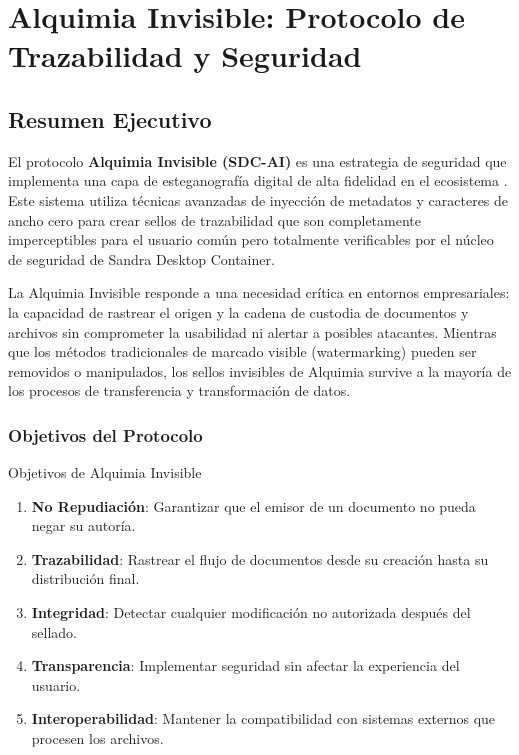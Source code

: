 
\chapter{Alquimia Invisible: Protocolo de Trazabilidad y Seguridad}
\label{ch:alquimia}


\section{Resumen Ejecutivo}
\label{sec:ai-resumen}

El protocolo \textbf{Alquimia Invisible (SDC-AI)} es una estrategia de seguridad que implementa una capa de esteganografía digital de alta fidelidad en el ecosistema \sdc{}. Este sistema utiliza técnicas avanzadas de inyección de metadatos y caracteres de ancho cero para crear sellos de trazabilidad que son completamente imperceptibles para el usuario común pero totalmente verificables por el núcleo de seguridad de Sandra Desktop Container.

La Alquimia Invisible responde a una necesidad crítica en entornos empresariales: la capacidad de rastrear el origen y la cadena de custodia de documentos y archivos sin comprometer la usabilidad ni alertar a posibles atacantes. Mientras que los métodos tradicionales de marcado visible (watermarking) pueden ser removidos o manipulados, los sellos invisibles de Alquimia survive a la mayoría de los procesos de transferencia y transformación de datos.

\subsection{Objetivos del Protocolo}

\begin{caja}{Objetivos de Alquimia Invisible}
\begin{enumerate}
\item \textbf{No Repudiación}: Garantizar que el emisor de un documento no pueda negar su autoría.
\item \textbf{Trazabilidad}: Rastrear el flujo de documentos desde su creación hasta su distribución final.
\item \textbf{Integridad}: Detectar cualquier modificación no autorizada después del sellado.
\item \textbf{Transparencia}: Implementar seguridad sin afectar la experiencia del usuario.
\item \textbf{Interoperabilidad}: Mantener la compatibilidad con sistemas externos que procesen los archivos.
\end{enumerate}
\end{caja}

